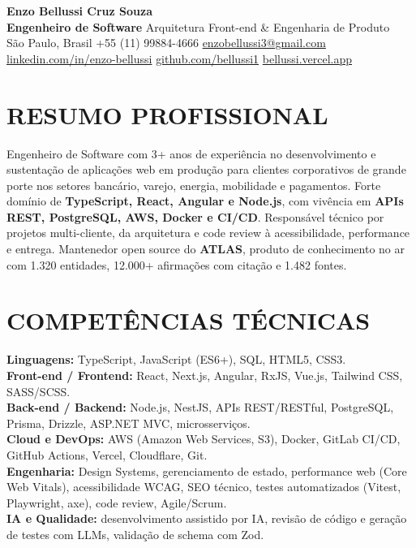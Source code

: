 ﻿\documentclass[10pt,a4paper]{article}
\begin{document}
\begin{center}
  {\fontsize{17}{19}\selectfont\textbf{Enzo Bellussi Cruz Souza}}\\[2pt]
  \small\textbf{Engenheiro de Software} \textbar{} Arquitetura Front-end \& Engenharia de Produto\\[2pt]
  \small
  S\~ao Paulo, Brasil \textbar{} +55 (11) 99884-4666 \textbar{}
  \href{mailto:enzobellussi3@gmail.com}{enzobellussi3@gmail.com}\\[1pt]
  \small
  \href{https://www.linkedin.com/in/enzo-bellussi/}{linkedin.com/in/enzo-bellussi} \textbar{}
  \href{https://github.com/bellussi1}{github.com/bellussi1} \textbar{}
  \href{https://bellussi.vercel.app/}{bellussi.vercel.app}
\end{center}

\section*{RESUMO PROFISSIONAL}
Engenheiro de Software com 3+ anos de experi\^encia no desenvolvimento e sustenta\c{c}\~ao de aplica\c{c}\~oes web em produ\c{c}\~ao para clientes corporativos de grande porte nos setores banc\'ario, varejo, energia, mobilidade e pagamentos. Forte dom\'inio de \textbf{TypeScript, React, Angular e Node.js}, com viv\^encia em \textbf{APIs REST, PostgreSQL, AWS, Docker e CI/CD}. Respons\'avel t\'ecnico por projetos multi-cliente, da arquitetura e code review \`a acessibilidade, performance e entrega. Mantenedor open source do \textbf{ATLAS}, produto de conhecimento no ar com 1.320 entidades, 12.000+ afirma\c{c}\~oes com cita\c{c}\~ao e 1.482 fontes.

\section*{COMPET\^ENCIAS T\'ECNICAS}
\textbf{Linguagens:} TypeScript, JavaScript (ES6+), SQL, HTML5, CSS3.\\
\textbf{Front-end / Frontend:} React, Next.js, Angular, RxJS, Vue.js, Tailwind CSS, SASS/SCSS.\\
\textbf{Back-end / Backend:} Node.js, NestJS, APIs REST/RESTful, PostgreSQL, Prisma, Drizzle, ASP.NET MVC, microsservi\c{c}os.\\
\textbf{Cloud e DevOps:} AWS (Amazon Web Services, S3), Docker, GitLab CI/CD, GitHub Actions, Vercel, Cloudflare, Git.\\
\textbf{Engenharia:} Design Systems, gerenciamento de estado, performance web (Core Web Vitals), acessibilidade WCAG, SEO t\'ecnico, testes automatizados (Vitest, Playwright, axe), code review, Agile/Scrum.\\
\textbf{IA e Qualidade:} desenvolvimento assistido por IA, revis\~ao de c\'odigo e gera\c{c}\~ao de testes com LLMs, valida\c{c}\~ao de schema com Zod.
\end{document}
